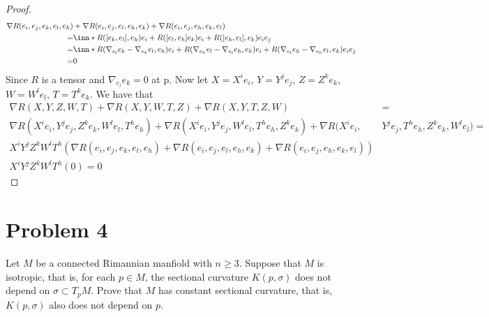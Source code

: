 \documentclass[a4paper]{article}
\begin{document}
\begin{proof}
  \[
    \begin{aligned}
      \nabla R(e_i, e_j, e_k, e_l, e_h) &+ \nabla R(e_i,e_j, e_l, e_h, e_k) + \nabla  R(e_i, e_j, e_h, e_k, e_l)  \\ 
      =& \inn*{R([e_k,e_l],e_h)e_i + R([e_l,e_h]e_k)e_i + R([e_h,e_l],e_k)e_i}{e_j} \\
      =& \inn*{R(\nabla_{e_l}e_k - \nabla_{e_k}e_l, e_h)e_i + R(\nabla_{e_h}e_l - \nabla_{e_l}e_h,e_k)e_i + R(\nabla_{e_l}e_h - \nabla_{e_h}e_l,e_k)e_i}{e_j} \\
      =& 0
    \end{aligned}
  \]
  Since $R$ is a tensor and $\nabla_{e_l}e_k = 0$ at p. Now let $X = X^i e_i$, $Y = Y^j e_j$, $Z = Z^k e_k$, $W = W^l e_l$, $T = T^k e_k$. We have that
  \[
    \begin{aligned}
      \nabla R(X,Y,Z,W,T) + \nabla R(X,Y,W,T,Z) + \nabla R(X,Y,T,Z,W) &= \\
      \nabla R(X^i e_i,Y^j e_j,Z^k e_k,W^l e_l,T^h e_h) + \nabla R(X^i e_i,Y^j e_j,W^l e_l,T^h e_h,Z^k e_k) + \nabla R(X^i e_i,&Y^j e_j,T^h e_h,Z^k e_k,W^l e_l) = \\
      X^i Y^j Z^k W^l T^h \left( \nabla R(e_i, e_j, e_k, e_l, e_h) + \nabla R(e_i,e_j, e_l, e_h, e_k) + \nabla  R(e_i, e_j, e_h, e_k, e_l) \right)  \\
      X^i Y^j Z^k W^l T^h(0) = 0 &
    \end{aligned}
  \]
\end{proof}

\section*{Problem 4}%
Let $M$ be a connected Rimannian manfiold with $n \geq 3$. Suppose that $M$ is isotropic, that is, for each $p \in M$, the sectional curvature $K(p,\sigma)$ does not depend on $\sigma \subset T_pM$. Prove that $M$ has constant sectional curvature, that is, $K(p, \sigma)$ also does not depend on $p$.
\end{document}
